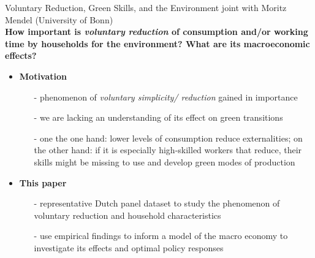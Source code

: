 \begin{frame}{Voluntary  Reduction, Green Skills, and the Environment}
		\vspace{-5mm}
	\hspace{-6mm}\footnotesize{joint with Moritz Mendel (University of Bonn)}\\
	
	
	\vspace{3mm}\textbf{\alert{How important is \textit{voluntary reduction} of consumption and/or working time by households for the environment? What are its macroeconomic effects? }}
	\pause
\begin{itemize}[<+->]
\item \textbf{Motivation}
\begin{itemize}
\item[-] phenomenon of \textit{voluntary simplicity/ reduction} gained in importance  \citep{Reboucas2021VoluntaryAgenda}%
\item[-] we are lacking an understanding of its effect on green transitions
\item[-] one the one hand: lower levels of consumption reduce externalities; on the other hand: if it is especially high-skilled workers that reduce, their skills might be missing to use and develop green modes of production
\end{itemize}
\item \textbf{This paper}
\begin{itemize}
	\item[-] representative Dutch panel dataset to study the phenomenon of voluntary reduction and household characteristics
	\item[-] use empirical findings to inform a model of the macro economy to investigate its effects and optimal policy responses
\end{itemize}
\end{itemize}
\end{frame}

